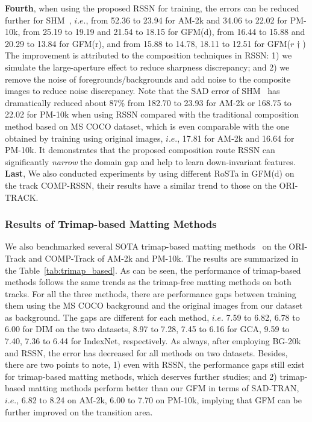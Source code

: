 \documentclass[twocolumn]{svjour3}
\begin{document}
\textbf{Fourth}, when using the proposed RSSN for training, the errors can be reduced further for SHM~\citep{chen2018semantic}, $i.e.$, from 52.36 to  23.94 for AM-2k and 34.06 to 22.02 for PM-10k, from 25.19 to 19.19 and 21.54 to 18.15 for GFM(d), from 16.44 to 15.88 and 20.29 to 13.84 for GFM(r), and from 15.88 to 14.78, 18.11 to 12.51 for GFM($r\dag$) The improvement is attributed to the composition techniques in RSSN: 1) we simulate the large-aperture effect to reduce sharpness discrepancy; and 2) we remove the noise of foregrounds/backgrounds and add noise to the composite images to reduce noise discrepancy. Note that the SAD error of SHM~\citep{chen2018semantic} has dramatically reduced about 87\% from 182.70 to 23.93 for AM-2k or 168.75 to 22.02 for PM-10k when using RSSN compared with the traditional composition method based on MS COCO dataset, which is even comparable with the one obtained by training using original images, $i.e.$, 17.81 for AM-2k and 16.64 for PM-10k. It demonstrates that the proposed composition route RSSN can significantly \textit{narrow} the domain gap and help to learn down-invariant features. \textbf{Last}, We also conducted experiments by using different RoSTa in GFM(d) on the track COMP-RSSN, their results have a similar trend to those on the ORI-TRACK.


\subsubsection{Results of Trimap-based Matting Methods} We also benchmarked several SOTA trimap-based matting methods~\citep{xu2017deep,li2020natural,hao2019indexnet} on the ORI-Track and COMP-Track of AM-2k and PM-10k. The results are summarized in the Table~\ref{tab:trimap_based}. As can be seen, the performance of trimap-based methods follows the same trends as the trimap-free matting methods on both tracks. For all the three methods, there are performance gaps between training them using the MS COCO \citep{lin2014microsoft} background and the original images from our dataset as background. The gaps are different for each method, $i.e.$ 7.59 to 6.82, 6.78 to 6.00 for DIM on the two datasets, 8.97 to 7.28, 7.45 to 6.16 for GCA, 9.59 to 7.40, 7.36 to 6.44 for IndexNet, respectively. As always, after employing BG-20k and RSSN, the error has decreased for all methods on two datasets. Besides, there are two points to note, 1) even with RSSN, the performance gaps still exist for trimap-based matting methods, which deserves further studies; and 2) trimap-based matting methods perform better than our GFM in terms of SAD-TRAN, $i.e.$, 6.82 to 8.24 on AM-2k, 6.00 to 7.70 on PM-10k, implying that GFM can be further improved on the transition area.
\end{document}

